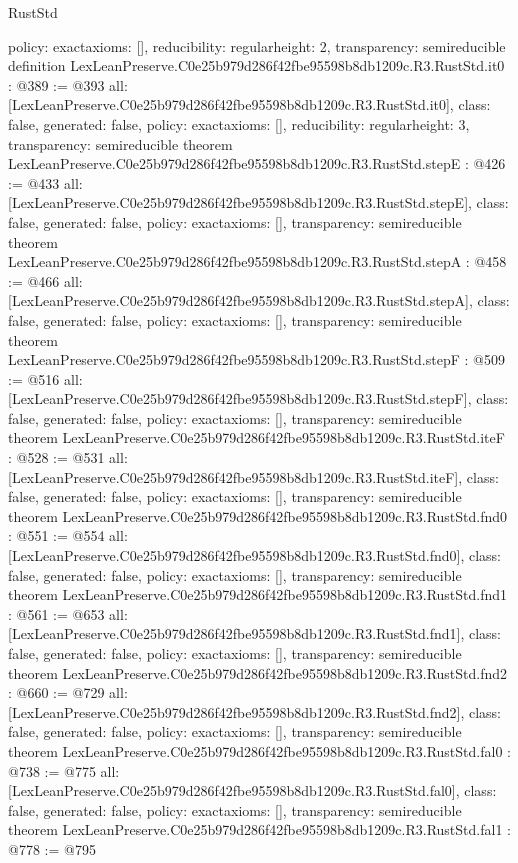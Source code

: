 \begin{lexlean}{RustStd}
\begin{coremodule}
{  policy: exact{axioms: []},
  reducibility: regular{height: 2},
  transparency: semireducible
}
definition LexLeanPreserve.C0e25b979d286f42fbe95598b8db1209c.R3.RustStd.it0 : @389 := @393 {
  all: [LexLeanPreserve.C0e25b979d286f42fbe95598b8db1209c.R3.RustStd.it0],
  class: false,
  generated: false,
  policy: exact{axioms: []},
  reducibility: regular{height: 3},
  transparency: semireducible
}
theorem LexLeanPreserve.C0e25b979d286f42fbe95598b8db1209c.R3.RustStd.stepE : @426 := @433 {
  all: [LexLeanPreserve.C0e25b979d286f42fbe95598b8db1209c.R3.RustStd.stepE],
  class: false,
  generated: false,
  policy: exact{axioms: []},
  transparency: semireducible
}
theorem LexLeanPreserve.C0e25b979d286f42fbe95598b8db1209c.R3.RustStd.stepA : @458 := @466 {
  all: [LexLeanPreserve.C0e25b979d286f42fbe95598b8db1209c.R3.RustStd.stepA],
  class: false,
  generated: false,
  policy: exact{axioms: []},
  transparency: semireducible
}
theorem LexLeanPreserve.C0e25b979d286f42fbe95598b8db1209c.R3.RustStd.stepF : @509 := @516 {
  all: [LexLeanPreserve.C0e25b979d286f42fbe95598b8db1209c.R3.RustStd.stepF],
  class: false,
  generated: false,
  policy: exact{axioms: []},
  transparency: semireducible
}
theorem LexLeanPreserve.C0e25b979d286f42fbe95598b8db1209c.R3.RustStd.iteF : @528 := @531 {
  all: [LexLeanPreserve.C0e25b979d286f42fbe95598b8db1209c.R3.RustStd.iteF],
  class: false,
  generated: false,
  policy: exact{axioms: []},
  transparency: semireducible
}
theorem LexLeanPreserve.C0e25b979d286f42fbe95598b8db1209c.R3.RustStd.fnd0 : @551 := @554 {
  all: [LexLeanPreserve.C0e25b979d286f42fbe95598b8db1209c.R3.RustStd.fnd0],
  class: false,
  generated: false,
  policy: exact{axioms: []},
  transparency: semireducible
}
theorem LexLeanPreserve.C0e25b979d286f42fbe95598b8db1209c.R3.RustStd.fnd1 : @561 := @653 {
  all: [LexLeanPreserve.C0e25b979d286f42fbe95598b8db1209c.R3.RustStd.fnd1],
  class: false,
  generated: false,
  policy: exact{axioms: []},
  transparency: semireducible
}
theorem LexLeanPreserve.C0e25b979d286f42fbe95598b8db1209c.R3.RustStd.fnd2 : @660 := @729 {
  all: [LexLeanPreserve.C0e25b979d286f42fbe95598b8db1209c.R3.RustStd.fnd2],
  class: false,
  generated: false,
  policy: exact{axioms: []},
  transparency: semireducible
}
theorem LexLeanPreserve.C0e25b979d286f42fbe95598b8db1209c.R3.RustStd.fal0 : @738 := @775 {
  all: [LexLeanPreserve.C0e25b979d286f42fbe95598b8db1209c.R3.RustStd.fal0],
  class: false,
  generated: false,
  policy: exact{axioms: []},
  transparency: semireducible
}
theorem LexLeanPreserve.C0e25b979d286f42fbe95598b8db1209c.R3.RustStd.fal1 : @778 := @795 {
}
\end{coremodule}
\end{lexlean}
